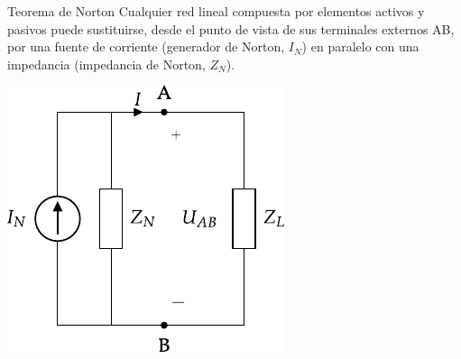 \documentclass[aspectratio=169, usenames,svgnames,dvipsnames]{beamer}
\begin{document}
\begin{frame}{Teorema de Norton}
    \vspace{3mm}
    Cualquier \alert{red lineal} compuesta por elementos activos y pasivos puede sustituirse, desde el punto de vista de sus terminales externos AB, por una \alert{fuente de corriente} (generador de Norton, \(I_N\)) en \alert{paralelo} con una impedancia (impedancia de Norton, \(Z_N\)).

    \vspace{2mm}
    \begin{center}
        \includegraphics[height=0.6\textheight]{../figs/EquivalenteNorton.pdf}
    \end{center}
\end{frame}

\end{document}
